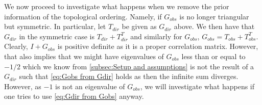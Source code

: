 \documentclass[../Thesis.tex]{subfiles}
\begin{document}
We now proceed to investigate what happens when we remove the prior information of the topological ordering. Namely, if $G_{obs}$ is no longer triangular but symmetric. In particular, let $T_{dir}$ be given as $G_{dir}$ above. We then have that $G_{dir}$ in the symmetric case is $T_{dir} + T_{dir}^T$ and similarly for $G_{obs}$, $G_{obs} = T_{obs} + T_{obs}^T$. Clearly, $I + G_{obs}$ is positive definite as it is a proper correlation matrix. However, that also implies that we might have eigenvalues of $G_{obs}$ less than or equal to $-1/2$ which we know from \autoref{subsec:Setup and assumptions} is not the result of a $G_{dir}$ such that \autoref{eq:Gobs from Gdir} holds as then the infinite sum diverges. However, as $-1$ is not an eigenvalue of $G_{obs}$, we will investigate what happens if one tries to use \autoref{eq:Gdir from Gobs} anyway.
\end{document}
